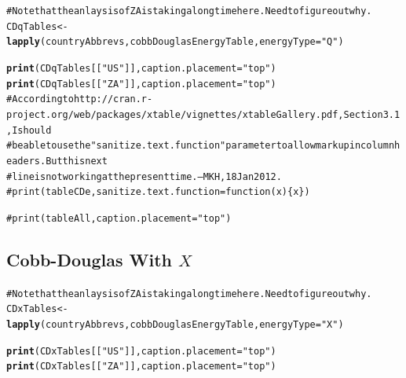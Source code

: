 \documentclass[preprint,authoryear,12pt]{elsarticle}\usepackage{graphicx, color}
\makeatletter
\newcommand{\hlfunctioncall}[1]{\textcolor[rgb]{0.501960784313725,0,0.329411764705882}{\textbf{#1}}}%
\newcommand{\hlstring}[1]{\textcolor[rgb]{0.6,0.6,1}{#1}}%
\newcommand{\hlcomment}[1]{\textcolor[rgb]{0.180392156862745,0.6,0.341176470588235}{#1}}%
\newenvironment{kframe}{%
 \def\at@end@of@kframe{}%
 \ifinner\ifhmode%
  \def\at@end@of@kframe{\end{minipage}}%
  \begin{minipage}{\columnwidth}%
 \fi\fi%
 \def\FrameCommand##1{\hskip\@totalleftmargin \hskip-\fboxsep
 \colorbox{shadecolor}{##1}\hskip-\fboxsep
     \hskip-\linewidth \hskip-\@totalleftmargin \hskip\columnwidth}%
 \MakeFramed {\advance\hsize-\width
   \@totalleftmargin\z@ \linewidth\hsize
   \@setminipage}}%
 {\par\unskip\endMakeFramed%
 \at@end@of@kframe}
\newenvironment{knitrout}{}{} %
\makeatother
\begin{document}
\begin{knitrout}
\color{fgcolor}\begin{kframe}
\begin{alltt}
\hlcomment{# Note that the anlaysis of ZA is taking a long time here. Need to figure out why.}
CDqTables <- \hlfunctioncall{lapply}(countryAbbrevs, cobbDouglasEnergyTable, energyType=\hlstring{"Q"})
\end{alltt}
\end{kframe}
\end{knitrout}


\begin{kframe}
\begin{alltt}
\hlfunctioncall{print}(CDqTables[[\hlstring{"US"}]], caption.placement=\hlstring{"top"})
\hlfunctioncall{print}(CDqTables[[\hlstring{"ZA"}]], caption.placement=\hlstring{"top"})
\hlcomment{# According to http://cran.r-project.org/web/packages/xtable/vignettes/xtableGallery.pdf, Section 3.1, I should }
\hlcomment{# be able to use the "sanitize.text.function" parameter to allow markup in column headers. But this next}
\hlcomment{# line is not working at the present time. --MKH, 18 Jan 2012.}
\hlcomment{# print(tableCDe, sanitize.text.function = function(x)\{x\})}

\hlcomment{#print(tableAll, caption.placement="top")}
\end{alltt}
\end{kframe}


\subsection{Cobb-Douglas With $X$}

\begin{knitrout}
\color{fgcolor}\begin{kframe}
\begin{alltt}
\hlcomment{# Note that the anlaysis of ZA is taking a long time here. Need to figure out why.}
CDxTables <- \hlfunctioncall{lapply}(countryAbbrevs, cobbDouglasEnergyTable, energyType=\hlstring{"X"})
\end{alltt}
\end{kframe}
\end{knitrout}


\begin{kframe}
\begin{alltt}
\hlfunctioncall{print}(CDxTables[[\hlstring{"US"}]], caption.placement=\hlstring{"top"})
\hlfunctioncall{print}(CDxTables[[\hlstring{"ZA"}]], caption.placement=\hlstring{"top"})
\end{alltt}
\end{kframe}
\end{document}
